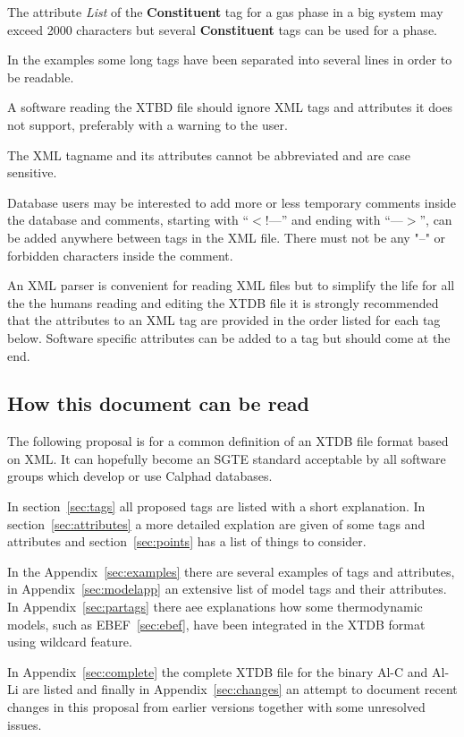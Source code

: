 \documentclass{article}
\begin{document}
\begin{appendices}
The attribute {\em List} of the {\bf Constituent} tag for a gas phase
in a big system may exceed 2000 characters but several {\bf
  Constituent} tags can be used for a phase.

In the examples some long tags have been separated into several lines
in order to be readable.

A software reading the XTBD file should ignore XML tags and attributes
it does not support, preferably with a warning to the user.

The XML tagname and its attributes cannot be abbreviated and are case
sensitive.

Database users may be interested to add more or less temporary
comments inside the database and comments, starting with ``$<$!---''
and ending with ``---$>$'', can be added anywhere between tags in the
XML file.  There must not be any "--" or forbidden characters inside
the comment.

An XML parser is convenient for reading XML files but to simplify the
life for all the the humans reading and editing the XTDB file it is
strongly recommended that the attributes to an XML tag are provided in
the order listed for each tag below.  Software specific attributes can
be added to a tag but should come at the end.

\subsection{How this document can be read}

The following proposal is for a common definition of an XTDB file
format based on XML.  It can hopefully become an SGTE standard
acceptable by all software groups which develop or use Calphad
databases.

In section~\ref{sec:tags} all proposed tags are listed with a short
explanation.  In section~\ref{sec:attributes} a more detailed
explation are given of some tags and attributes and
section~\ref{sec:points} has a list of things to consider.

In the Appendix~\ref{sec:examples} there are several examples of tags
and attributes, in Appendix~\ref{sec:modelapp} an extensive list of
model tags and their attributes.  In Appendix~\ref{sec:partags} there
aee explanations how some thermodynamic models, such as
EBEF~\ref{sec:ebef}, have been integrated in the XTDB format using
wildcard feature.

In Appendix~\ref{sec:complete} the complete XTDB file for the binary
Al-C and Al-Li are listed and finally in Appendix~\ref{sec:changes} an
attempt to document recent changes in this proposal from earlier
versions together with some unresolved issues.


\end{appendices}
\end{document}
